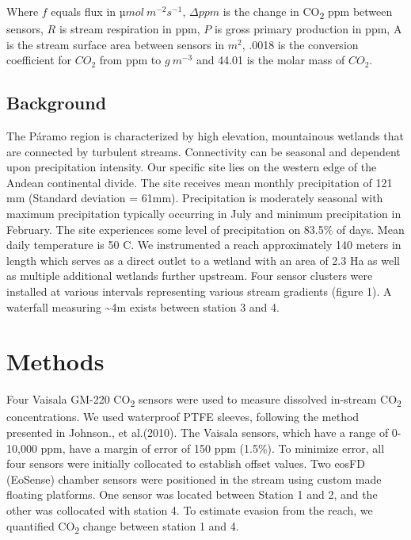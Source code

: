 \documentclass[draft,linenumbers]{agujournal2018}
\begin{document}
Where \(f\) equals flux in \(µmol\:m^{-2}s^{-1}\), \(\Delta ppm\) is the
change in CO\textsubscript{2} ppm between sensors, \(R\) is stream
respiration in ppm, \(P\) is gross primary production in ppm, A is the
stream surface area between sensors in \(m^2\), .0018 is the conversion
coefficient for \(CO_2\) from ppm to \(g\:m^{-3}\) and 44.01 is the
molar mass of \(CO_2\).

\subsection{Background}

The Páramo region is characterized by high elevation, mountainous
wetlands that are connected by turbulent streams. Connectivity can be
seasonal and dependent upon precipitation intensity. Our specific site
lies on the western edge of the Andean continental divide. The site
receives mean monthly precipitation of 121 mm (Standard deviation =
61mm). Precipitation is moderately seasonal with maximum precipitation
typically occurring in July and minimum precipitation in February. The
site experiences some level of precipitation on 83.5\% of days. Mean
daily temperature is 50 C. We instrumented a reach approximately 140
meters in length which serves as a direct outlet to a wetland with an
area of 2.3 Ha as well as multiple additional wetlands further upstream.
Four sensor clusters were installed at various intervals representing
various stream gradients (figure 1). A waterfall measuring
\textasciitilde{}4m exists between station 3 and 4.

\section{Methods}

Four Vaisala GM-220 CO\textsubscript{2} sensors were used to measure
dissolved in-stream CO\textsubscript{2} concentrations. We used
waterproof PTFE sleeves, following the method presented in Johnson., et
al.(2010). The Vaisala sensors, which have a range of 0-10,000 ppm, have
a margin of error of 150 ppm (1.5\%). To minimize error, all four
sensors were initially collocated to establish offset values. Two eosFD
(EoSense) chamber sensors were positioned in the stream using custom
made floating platforms. One sensor was located between Station 1 and 2,
and the other was collocated with station 4. To estimate evasion from
the reach, we quantified CO\textsubscript{2} change between station 1
and 4.
\end{document}
